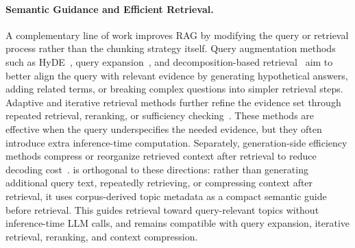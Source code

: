 \paragraph{Semantic Guidance and Efficient Retrieval. }
A complementary line of work improves RAG by modifying the query or retrieval process rather than the chunking strategy itself. Query augmentation methods such as HyDE~\cite{gao-etal-2023-precise}, query expansion~\cite{wang-etal-2023-query2doc, zhou-etal-2024-hyqe}, and decomposition-based retrieval~\cite{trivedi-etal-2023-interleaving, zheng2024take} aim to better align the query with relevant evidence by generating hypothetical answers, adding related terms, or breaking complex questions into simpler retrieval steps. Adaptive and iterative retrieval methods further refine the evidence set through repeated retrieval, reranking, or sufficiency checking~\cite{verma-etal-2026-reflectiverag}. These methods are effective when the query underspecifies the needed evidence, but they often introduce extra inference-time computation. Separately, generation-side efficiency methods compress or reorganize retrieved context after retrieval to reduce decoding cost~\cite{lin2025refrag, louis2026oscar}. \name{} is orthogonal to these directions: rather than generating additional query text, repeatedly retrieving, or compressing context after retrieval, it uses corpus-derived topic metadata as a compact semantic guide before retrieval. This guides retrieval toward query-relevant topics without inference-time LLM calls, and remains compatible with query expansion, iterative retrieval, reranking, and context compression.
